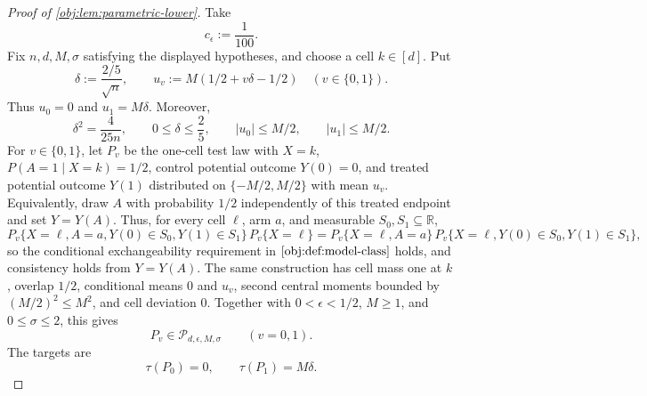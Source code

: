 \begin{proof}[Proof of \cref{obj:lem:parametric-lower}]
Take
\[
c_\epsilon:=\frac1{100}.
\]
Fix \(n,d,M,\sigma\) satisfying the displayed hypotheses, and choose a cell \(k\in[d]\).  Put
\[
\delta:=\frac{2/5}{\sqrt n},
\qquad
u_v:=M(1/2+v\delta-1/2)\quad (v\in\{0,1\}).
\]
Thus \(u_0=0\) and \(u_1=M\delta\).  Moreover,
\[
\delta^2=\frac{4}{25n},
\qquad
0\le\delta\le\frac25,
\qquad
|u_0|\le M/2,
\qquad
|u_1|\le M/2 .
\]
For \(v\in\{0,1\}\), let \(P_v\) be the one-cell test law with \(X=k\), \(P(A=1\mid X=k)=1/2\), control potential outcome \(Y(0)=0\), and treated potential outcome \(Y(1)\) distributed on \(\{-M/2,M/2\}\) with mean \(u_v\).  Equivalently, draw \(A\) with probability \(1/2\) independently of this treated endpoint and set \(Y=Y(A)\).  Thus, for every cell \(\ell\), arm \(a\), and measurable \(S_0,S_1\subseteq\mathbb R\),
\[
P_v\{X=\ell,A=a,Y(0)\in S_0,Y(1)\in S_1\}\,P_v\{X=\ell\}
=
P_v\{X=\ell,A=a\}\,P_v\{X=\ell,Y(0)\in S_0,Y(1)\in S_1\},
\]
so the conditional exchangeability requirement in \(\cref{obj:def:model-class}\) holds, and consistency holds from \(Y=Y(A)\).  The same construction has cell mass one at \(k\), overlap \(1/2\), conditional means \(0\) and \(u_v\), second central moments bounded by \((M/2)^2\le M^2\), and cell deviation \(0\).  Together with \(0<\epsilon<1/2\), \(M\ge1\), and \(0\le\sigma\le2\), this gives
\[
P_v\in\mathcal P_{d,\epsilon,M,\sigma}
\qquad (v=0,1).
\]
The targets are
\[
\tau(P_0)=0,
\qquad
\tau(P_1)=M\delta .
\]


\end{proof}
